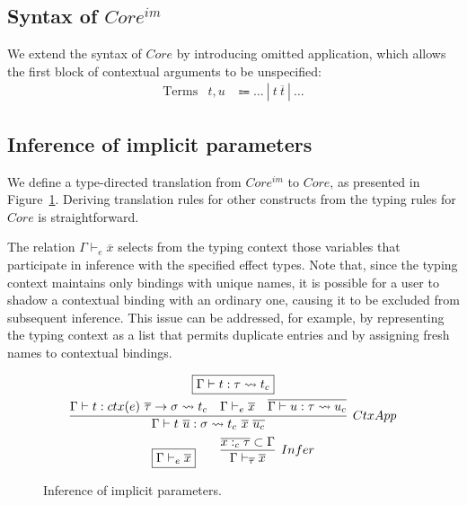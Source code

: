 \documentclass[acmsmall]{acmart}
\newcommand{\mathframebox}[1]{\framebox{$\displaystyle #1$}}
\newcommand{\vor}{~|~}
\newcommand{\ap}{~}
\newcommand{\ctx}[1]{ctx(#1)~}
\newcommand{\step}{\rightsquigarrow}
\begin{document}
\subsection{Syntax of $Core^{im}$}

We extend the syntax of $Core$ by introducing omitted application, which allows the first block of contextual arguments to be unspecified:
\[
    \begin{array}{lcc}
        \text{Terms} & t, u &\Coloneqq \ldots \vor t\ap\overline{t} \vor \ldots
    \end{array}
\]

\subsection{Inference of implicit parameters} \label{subsec:inference}

We define a type-directed translation from $Core^{im}$ to $Core$, as presented in Figure~\ref{fig:fim-fex-inference}.
Deriving translation rules for other constructs from the typing rules for $Core$ is straightforward.

The relation $\Gamma\vdash_e \overline{x}$ selects from the typing context those variables that participate in inference with the specified effect types.
Note that, since the typing context maintains only bindings with unique names, it is possible for a user to shadow a contextual binding with an ordinary one, causing it to be excluded from subsequent inference.
This issue can be addressed, for example, by representing the typing context as a list that permits duplicate entries and by assigning fresh names to contextual bindings.

\begin{figure}
    \begin{gather*}
        \mathframebox{\Gamma\vdash t : \tau \step t_{c}} \\
        \infer[CtxApp]{
            \Gamma\vdash t\ap\overline{u} : \sigma \step t_{c} \ap \overline{x}\ap\overline{u_{c}}
        }{
            \Gamma\vdash t : \ctx{e} \overline{\tau} \to \sigma \step t_{c} &
            \Gamma\vdash_e\overline{x} &
            \overline{\Gamma\vdash u : \tau \step u_{c}}
        } \\
        \mathframebox{\Gamma\vdash_e \overline{x}}
        \text{\hspace{2em}}
        \infer[Infer]{\Gamma\vdash_{\overline{\tau}} \overline{x}}{\overline{x :_c \tau}\subset \Gamma}
    \end{gather*}
    \caption{Inference of implicit parameters.}
    \label{fig:fim-fex-inference}
\end{figure}
\end{document}
